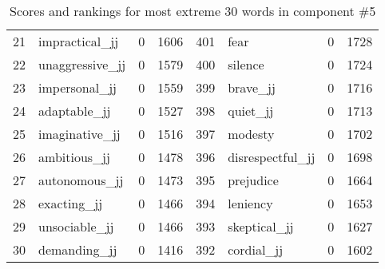 \begin{table}[tbp]
\begin{tabular}{| rlr@{.}l | rlr@{.}l |}
    21 & impractical\_jj & 0 & 1606    &    401 & fear & 0 & 1728 \\
    22 & unaggressive\_jj & 0 & 1579    &    400 & silence & 0 & 1724 \\
    23 & impersonal\_jj & 0 & 1559    &    399 & brave\_jj & 0 & 1716 \\
    24 & adaptable\_jj & 0 & 1527    &    398 & quiet\_jj & 0 & 1713 \\
    25 & imaginative\_jj & 0 & 1516    &    397 & modesty & 0 & 1702 \\
    26 & ambitious\_jj & 0 & 1478    &    396 & disrespectful\_jj & 0 & 1698 \\
    27 & autonomous\_jj & 0 & 1473    &    395 & prejudice & 0 & 1664 \\
    28 & exacting\_jj & 0 & 1466    &    394 & leniency & 0 & 1653 \\
    29 & unsociable\_jj & 0 & 1466    &    393 & skeptical\_jj & 0 & 1627 \\
    30 & demanding\_jj & 0 & 1416    &    392 & cordial\_jj & 0 & 1602 \\
    \hline
    \end{tabular}
    \caption{Scores and rankings for most extreme 30 words in component \#5} 
\end{table}
\clearpage
